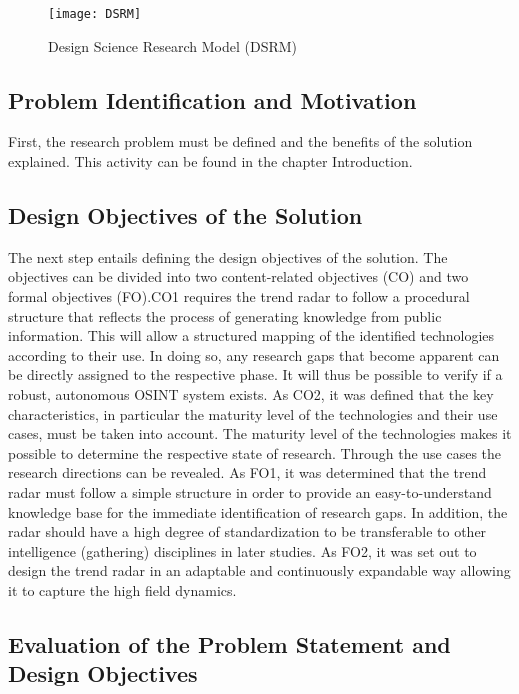 \documentclass[10pt]{article}
\begin{document}
\begin{figure*}[thb]
    \centering
    \texttt{[image: DSRM]}
    \caption{Design Science Research Model (DSRM)}
    \label{fig:DSRM}
\end{figure*}

\subsection{Problem Identification and Motivation}

First, the research problem must be defined and the benefits of the solution explained.
This activity can be found in the chapter Introduction.

\subsection{Design Objectives of the Solution}

The next step entails defining the design objectives of the solution. The
objectives can be divided into two content-related objectives (CO) and
two formal objectives (FO).CO1 requires the trend radar to follow a procedural
structure that reflects the process of generating knowledge from
public information. This will allow a structured mapping of the
identified technologies according to their use. In doing so, any
research gaps that become apparent can be directly assigned to the
respective phase. It will thus be possible to verify if a robust,
autonomous OSINT system exists. As CO2, it was defined that the key
characteristics, in particular the maturity level of the technologies
and their use cases, must be taken into account. The maturity level of
the technologies makes it possible to determine the respective state
of research. Through the use cases the research directions can be
revealed. As FO1, it was determined that the trend radar must follow
a simple structure in order to provide an easy-to-understand knowledge
base for the immediate identification of research gaps. In addition,
the radar should have a high degree of standardization to be
transferable to other intelligence (gathering) disciplines in later
studies. As FO2, it was set out to design the trend radar in an
adaptable and continuously expandable way allowing it to capture the
high field dynamics.

\subsection{Evaluation of the Problem Statement and Design Objectives}
\end{document}
